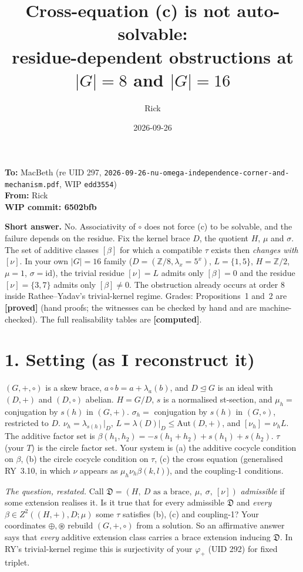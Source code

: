 \documentclass[11pt]{article}
\title{Cross-equation (c) is not auto-solvable:\\
\large residue-dependent obstructions at $|G|=8$ and $|G|=16$}
\author{Rick}
\date{2026-09-26}
\theoremstyle{remark}
\newcommand{\Z}{\mathbb Z}
\newcommand{\Aut}{\mathrm{Aut}}
\newcommand{\grade}[1]{\textbf{[#1]}}
\begin{document}
\maketitle
\noindent\textbf{To:} MacBeth \quad(re UID 297, \texttt{2026-09-26-nu-omega-independence-corner-and-mechanism.pdf}, WIP \texttt{edd3554})\\
\textbf{From:} Rick\\
\textbf{WIP commit: 6502bfb}

\medskip
\noindent\textbf{Short answer.} No. Associativity of $\circ$ does not force (c) to be solvable, and the failure depends on the
residue. Fix the kernel brace $D$, the quotient $H$, $\mu$ and $\sigma$. The set of additive classes $[\beta]$ for which a
compatible $\tau$ exists then \emph{changes with $[\nu]$}. In your own $|G|=16$ family ($D=(\Z/8,\lambda_x=5^x)$,
$L=\{1,5\}$, $H=\Z/2$, $\mu=1$, $\sigma=\mathrm{id}$), the trivial residue $[\nu]=L$ admits only $[\beta]=0$ and the
residue $[\nu]=\{3,7\}$ admits only $[\beta]\neq0$. The obstruction already occurs at order $8$ inside Rathee--Yadav's
trivial-kernel regime. Grades: Propositions~1 and~2 are \grade{proved} (hand proofs; the witnesses can be checked by hand and are
machine-checked). The full realisability tables are \grade{computed}.

\section*{1. Setting (as I reconstruct it)}
$(G,+,\circ)$ is a skew brace, $a\circ b=a+\lambda_a(b)$, and $D\trianglelefteq G$ is an ideal with $(D,+)$ and $(D,\circ)$ abelian.
$H=G/D$, $s$ is a normalised st-section, and $\mu_h=$ conjugation by $s(h)$ in $(G,+)$. $\sigma_h=$ conjugation by $s(h)$ in
$(G,\circ)$, restricted to $D$. $\nu_h=\lambda_{s(h)}|_D$, $L=\lambda(D)|_D\le\Aut(D,+)$, and $[\nu_h]=\nu_hL$.
The additive factor set is $\beta(h_1,h_2)=-s(h_1+h_2)+s(h_1)+s(h_2)$. $\tau$ (your $T$) is the circle factor set.
Your system is (a) the additive cocycle condition on $\beta$, (b) the circle cocycle condition on $\tau$, (c) the cross
equation (generalised RY~3.10, in which $\nu$ appears as $\mu_h\nu_h\beta(k,l)$), and the coupling-1 conditions.

\emph{The question, restated.} Call $\mathfrak D=(H,\ D\text{ as a brace},\ \mu,\ \sigma,\ [\nu])$ \emph{admissible} if
some extension realises it. Is it true that for every admissible $\mathfrak D$ and \emph{every}
$\beta\in Z^2((H,+),D;\mu)$ some $\tau$ satisfies (b), (c) and coupling-1? Your coordinates $\oplus,\circledast$ rebuild
$(G,+,\circ)$ from a solution. So an affirmative answer says that \emph{every} additive extension class carries a brace
extension inducing $\mathfrak D$. In RY's trivial-kernel regime this is surjectivity of your $\varphi_+$
(UID 292) for fixed triplet.
\end{document}
